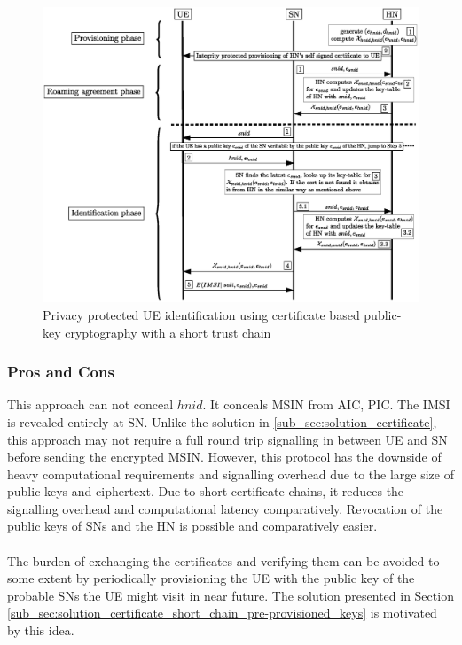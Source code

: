 \documentclass[lnicst,sechang,a4paper]{svmultln}
\begin{document}
\begin{figure}
\begin{center}
  \includegraphics[width=.98\textwidth]{root-key2.eps}
\caption{Privacy protected UE identification using certificate based public-key cryptography with a short trust chain}
\label{fig:solution_certificate_short_chain}       %
\end{center}
\end{figure}

\subsubsection{Pros and Cons}
This approach can not conceal $hnid$. It conceals MSIN from AIC, PIC. The IMSI is revealed entirely at SN. Unlike the solution in \ref{sub_sec:solution_certificate}, this approach may not require a full round trip signalling in between UE and SN before sending the encrypted MSIN. However, this protocol has the downside of heavy computational requirements and signalling overhead due to the large size of public keys and ciphertext. Due to short certificate chains, it reduces the signalling overhead and computational latency comparatively. Revocation of the public keys of SNs and the HN is possible and comparatively easier. 
\paragraph{}
The burden of exchanging the certificates and verifying them can be avoided to some extent by periodically provisioning the UE with the public key of the probable SNs the UE might visit in near future. The solution presented in Section \ref{sub_sec:solution_certificate_short_chain_pre-provisioned_keys} is motivated by this idea.
\end{document}
